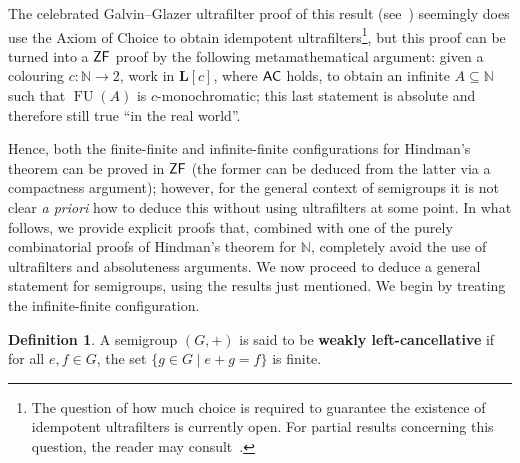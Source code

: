 \documentclass[10pt,a4paper]{amsart}
\theoremstyle{definition}
\newtheorem{definition}[theorem]{Definition}
\newcommand{\zf}{\mathnormal{\mathsf{ZF}}}
\newcommand{\ac}{\mathnormal{\mathsf{AC}}}
\theoremstyle{remark}
\newtheorem{remark}[theorem]{Remark}
\numberwithin{equation}{section}
\begin{document}
The celebrated Galvin--Glazer ultrafilter proof of this result (see~\cite{HindmanStrauss2012}) seemingly does use the Axiom of Choice to obtain idempotent ultrafilters\footnote{The question of how much choice is required to guarantee the existence of idempotent ultrafilters is currently open. For partial results concerning this question, the reader may consult~\cite{Tachtsis2018,DiNassoTachtsis2018,FernandezNavarroSoria2025}.}, but this proof can be turned into a $\zf$ proof by the following metamathematical argument: given a colouring $c:\mathbb N\longrightarrow 2$, work in $\mathbf{L}[c]$, where $\ac$ holds, to obtain an infinite $A\subseteq\mathbb N$ such that $\operatorname{FU}(A)$ is $c$-monochromatic; this last statement is absolute and therefore still true ``in the real world''.

Hence, both the finite-finite and infinite-finite configurations for Hindman's theorem can be proved in $\zf$ (the former can be deduced from the latter via a compactness argument); however, for the general context of semigroups it is not clear {\it a priori} how to deduce this without using ultrafilters at some point. In what follows, we provide explicit proofs that, combined with one of the purely combinatorial proofs of Hindman's theorem for $\mathbb N$, completely avoid the use of ultrafilters and absoluteness arguments. We now proceed to deduce a general statement for semigroups, using the results just mentioned. We begin by treating the infinite-finite configuration.




\begin{definition}
    A semigroup $(G, +)$ is said to be \textbf{weakly left-cancellative} if for all $e, f\in G$, the set $\{g\in G\mid e+g=f\}$ is finite.
\end{definition}
\end{document}
